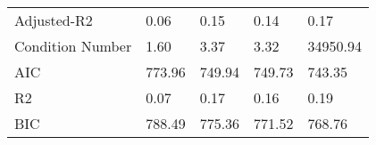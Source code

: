 \begin{table}
\begin{center}
\begin{tabular}{lllll}
Adjusted-R2                                    & 0.06     & 0.15    & 0.14    & 0.17        \\
Condition Number                               & 1.60     & 3.37    & 3.32    & 34950.94    \\
AIC                                            & 773.96   & 749.94  & 749.73  & 743.35      \\
R2                                             & 0.07     & 0.17    & 0.16    & 0.19        \\
BIC                                            & 788.49   & 775.36  & 771.52  & 768.76      \\
\hline
\end{tabular}
\end{center}
\end{table}